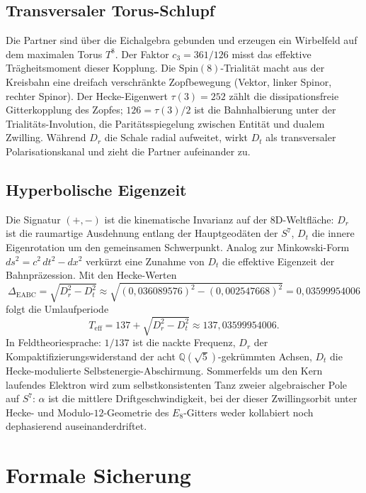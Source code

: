 \documentclass[11pt,a4paper]{article}
\begin{document}
\subsection{Transversaler Torus-Schlupf}
Die Partner sind über die Eichalgebra gebunden und erzeugen ein Wirbelfeld auf dem maximalen Torus $T^8$.
Der Faktor $c_3=361/126$ misst das effektive Trägheitsmoment dieser Kopplung.
Die $\mathrm{Spin}(8)$-Trialität macht aus der Kreisbahn eine dreifach verschränkte Zopfbewegung (Vektor, linker Spinor, rechter Spinor).
Der Hecke-Eigenwert $\tau(3)=252$ zählt die dissipationsfreie Gitterkopplung des Zopfes;
$126=\tau(3)/2$ ist die Bahnhalbierung unter der Trialitäts-Involution, die Paritätsspiegelung zwischen Entität und dualem Zwilling.
Während $D_r$ die Schale radial aufweitet, wirkt $D_t$ als transversaler Polarisationskanal und zieht die Partner aufeinander zu.

\subsection{Hyperbolische Eigenzeit}
Die Signatur $(+,-)$ ist die kinematische Invarianz auf der $8$D-Weltfläche:
$D_r$ ist die raumartige Ausdehnung entlang der Hauptgeodäten der $S^7$,
$D_t$ die innere Eigenrotation um den gemeinsamen Schwerpunkt.
Analog zur Minkowski-Form $ds^2=c^2\,dt^2-dx^2$ verkürzt eine Zunahme von $D_t$ die effektive Eigenzeit der Bahnpräzession.
Mit den Hecke-Werten
\begin{equation}
\Delta_{\mathrm{EABC}}
=\sqrt{D_r^2-D_t^2}
\approx\sqrt{(0{,}036089576)^2-(0{,}002547668)^2}
=0{,}03599954006
\end{equation}
folgt die Umlaufperiode
\begin{equation}
T_{\mathrm{eff}}=137+\sqrt{D_r^2-D_t^2}\approx 137{,}03599954006.
\end{equation}
In Feldtheoriesprache: $1/137$ ist die nackte Frequenz, $D_r$ der Kompaktifizierungswiderstand der acht $\mathbb{Q}(\sqrt{5})$-gekrümmten Achsen, $D_t$ die Hecke-modulierte Selbstenergie-Abschirmung.
Sommerfelds um den Kern laufendes Elektron wird zum selbstkonsistenten Tanz zweier algebraischer Pole auf $S^7$:
$\alpha$ ist die mittlere Driftgeschwindigkeit, bei der dieser Zwillingsorbit unter Hecke- und Modulo-$12$-Geometrie des $E_8$-Gitters weder kollabiert noch dephasierend auseinanderdriftet.

\section{Formale Sicherung}
\end{document}
